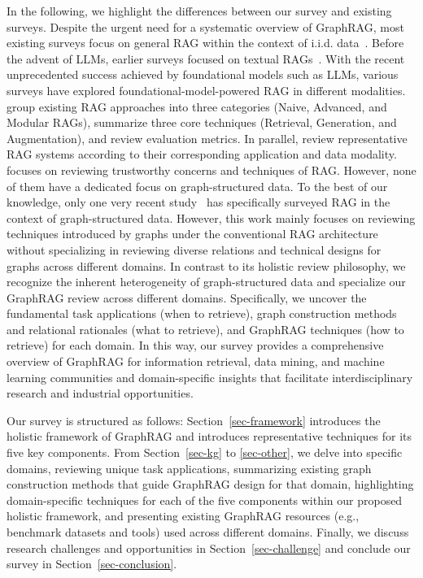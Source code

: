 In the following, we highlight the differences between our survey and existing surveys. Despite the urgent need for a systematic overview of GraphRAG, most existing surveys focus on general RAG within the context of i.i.d. data~\cite{asai2023retrieval, gao2023retrieval, li2022survey, zhao2024retrieval, zhou2024trustworthiness}. Before the advent of LLMs, earlier surveys focused on textual RAGs~\cite{asai2023retrieval, li2022survey}. With the recent unprecedented success achieved by foundational models such as LLMs, various surveys have explored foundational-model-powered RAG in different modalities. \citet{gao2023retrieval} group existing RAG approaches into three categories (Naive, Advanced, and Modular RAGs), summarize three core techniques (Retrieval, Generation, and Augmentation), and review evaluation metrics. In parallel, \citet{zhao2024retrieval} review representative RAG systems according to their corresponding application and data modality. \cite{zhou2024trustworthiness} focuses on reviewing trustworthy concerns and techniques of RAG. However, none of them have a dedicated focus on graph-structured data. To the best of our knowledge, only one very recent study~\cite{peng2024graph} has specifically surveyed RAG in the context of graph-structured data. However, this work mainly focuses on reviewing techniques introduced by graphs under the conventional RAG architecture without specializing in reviewing diverse relations and technical designs for graphs across different domains. In contrast to its holistic review philosophy, we recognize the inherent heterogeneity of graph-structured data and specialize our GraphRAG review across different domains. Specifically, we uncover the fundamental task applications (when to retrieve), graph construction methods and relational rationales (what to retrieve), and GraphRAG techniques (how to retrieve) for each domain. In this way, our survey provides a comprehensive overview of GraphRAG for information retrieval, data mining, and machine learning communities and domain-specific insights that facilitate interdisciplinary research and industrial opportunities.

Our survey is structured as follows: Section~\ref{sec-framework} introduces the holistic framework of GraphRAG and introduces representative techniques for its five key components. From Section~\ref{sec-kg} to \ref{sec-other}, we delve into specific domains, reviewing unique task applications, summarizing existing graph construction methods that guide GraphRAG design for that domain, highlighting domain-specific techniques for each of the five components within our proposed holistic framework, and presenting existing GraphRAG resources (e.g., benchmark datasets and tools) used across different domains. Finally, we discuss research challenges and opportunities in Section~\ref{sec-challenge} and conclude our survey in Section~\ref{sec-conclusion}.


